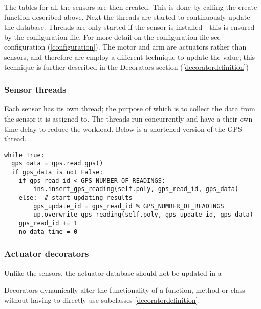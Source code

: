 The tables for all the sensors are then created. This is done by calling the create function described above. Next the threads are started to continuously update the database. Threads are only started if the sensor is installed - this is ensured by the configuration file. For more detail on the configuration file see configuration  (\ref{configuration}). The motor and arm are actuators rather than sensors, and therefore are employ a different technique to update the value; this technique is further described in the Decorators section (\ref{decoratordefinition})

\subsubsection{Sensor threads}
Each sensor has its own thread; the purpose of which is to collect the data from the sensor it is assigned to. The threads run concurrently and have a their own time delay to reduce the workload. 
Below is a shortened version of the GPS thread.
\begin{lstlisting} 
while True:
  gps_data = gps.read_gps()
  if gps_data is not False:
    if gps_read_id < GPS_NUMBER_OF_READINGS:
   		ins.insert_gps_reading(self.poly, gps_read_id, gps_data)
    else:  # start updating results
   		gps_update_id = gps_read_id % GPS_NUMBER_OF_READINGS
    	up.overwrite_gps_reading(self.poly, gps_update_id, gps_data)
    gps_read_id += 1
    no_data_time = 0
\end{lstlisting}          

\subsubsection{Actuator decorators}
Unlike the sensors, the actuator database should not be updated in a 

\label{decoratordefinition}
Decorators dynamically alter the functionality of a function, method or class without having to directly use subclasses \ref{decoratordefinition}.







